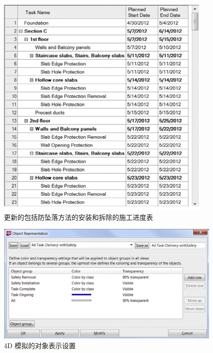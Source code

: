 \begin{figure}[thbp!]
    \centering
    \includegraphics[width=0.8\linewidth]{res/c4f9.png}
    \caption{更新的包括防坠落方法的安装和拆除的施工进度表}
    \label{fig:c4f9}
\end{figure}

\begin{figure}[thbp!]
    \centering
    \includegraphics[width=0.8\linewidth]{res/c4f10.png}
    \caption{4D 模拟的对象表示设置}
    \label{fig:c4f10}
\end{figure}

